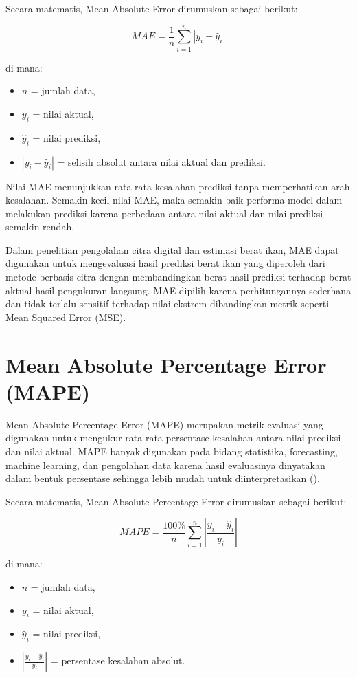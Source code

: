 Secara matematis, Mean Absolute Error dirumuskan sebagai berikut:

\begin{equation}
MAE = \frac{1}{n}\sum_{i=1}^{n} |y_i - \hat{y}_i|
\label{eq:mae}
\end{equation}

di mana:
\begin{itemize}
    \item $n$ = jumlah data,
    \item $y_i$ = nilai aktual,
    \item $\hat{y}_i$ = nilai prediksi,
    \item $|y_i - \hat{y}_i|$ = selisih absolut antara nilai aktual dan prediksi.
\end{itemize}

Nilai MAE menunjukkan rata-rata kesalahan prediksi tanpa memperhatikan arah
kesalahan. Semakin kecil nilai MAE, maka semakin baik performa model dalam
melakukan prediksi karena perbedaan antara nilai aktual dan nilai prediksi
semakin rendah.

Dalam penelitian pengolahan citra digital dan estimasi berat ikan, MAE dapat
digunakan untuk mengevaluasi hasil prediksi berat ikan yang diperoleh dari
metode berbasis citra dengan membandingkan berat hasil prediksi terhadap
berat aktual hasil pengukuran langsung. MAE dipilih karena perhitungannya
sederhana dan tidak terlalu sensitif terhadap nilai ekstrem dibandingkan
metrik seperti Mean Squared Error (MSE).
\section{Mean Absolute Percentage Error (MAPE)}
  Mean Absolute Percentage Error (MAPE) merupakan metrik evaluasi yang
digunakan untuk mengukur rata-rata persentase kesalahan antara nilai prediksi
dan nilai aktual. MAPE banyak digunakan pada bidang statistika, forecasting,
machine learning, dan pengolahan data karena hasil evaluasinya dinyatakan
dalam bentuk persentase sehingga lebih mudah untuk diinterpretasikan
(\textcite{Armstrong1992,Hyndman2006}).

Secara matematis, Mean Absolute Percentage Error dirumuskan sebagai berikut:

\begin{equation}
MAPE = \frac{100\%}{n}\sum_{i=1}^{n}
\left|\frac{y_i - \hat{y}_i}{y_i}\right|
\label{eq:mape}
\end{equation}

di mana:
\begin{itemize}
    \item $n$ = jumlah data,
    \item $y_i$ = nilai aktual,
    \item $\hat{y}_i$ = nilai prediksi,
    \item $\left|\frac{y_i - \hat{y}_i}{y_i}\right|$ = persentase kesalahan absolut.
\end{itemize}


